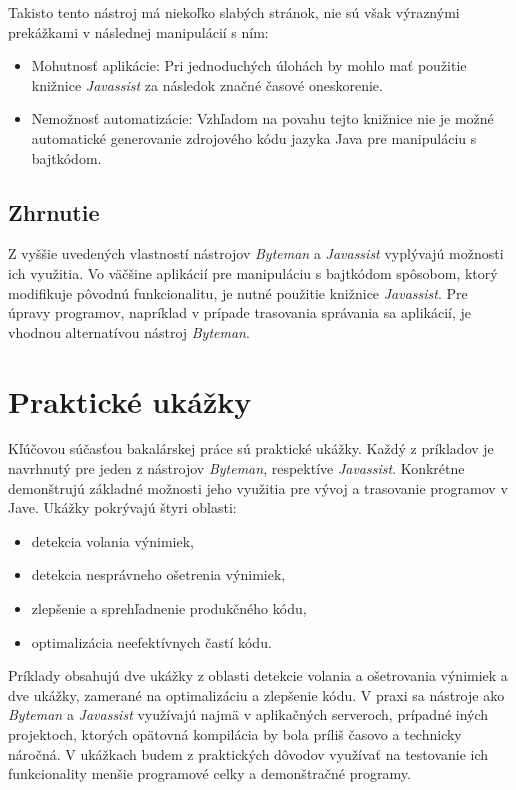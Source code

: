 \documentclass[11pt,final,oneside]{fithesis}
\begin{document}
Takisto tento nástroj má niekoľko slabých stránok, nie sú však výraznými prekážkami v následnej manipulácií s ním:

\begin{itemize}
\item Mohutnosť aplikácie: Pri jednoduchých úlohách by mohlo mať použitie 
knižnice \textit{Javassist} za následok značné časové oneskorenie.
\item Nemožnosť automatizácie: Vzhľadom na povahu tejto knižnice nie je možné 
automatické generovanie zdrojového kódu jazyka Java pre manipuláciu s 
bajtkódom.
\end{itemize}

\section{Zhrnutie}
Z vyššie uvedených vlastností nástrojov \textit{Byteman} a \textit{Javassist} 
vyplývajú možnosti ich využitia. Vo väčšine aplikácií pre manipuláciu s 
bajtkódom spôsobom, ktorý modifikuje pôvodnú funkcionalitu, je nutné použitie 
knižnice \textit{Javassist}. Pre úpravy programov, napríklad v prípade 
trasovania správania sa aplikácií, je vhodnou alternatívou nástroj 
\textit{Byteman}.

\chapter{Praktické ukážky}

Kľúčovou súčasťou bakalárskej práce sú praktické ukážky. Každý z príkladov je 
navrhnutý pre jeden z nástrojov \textit{Byteman}, respektíve 
\textit{Javassist}. Konkrétne demonštrujú základné možnosti jeho využitia pre 
vývoj a trasovanie programov v Jave. Ukážky pokrývajú štyri oblasti:

\begin{itemize}
\item detekcia volania výnimiek, 
\item detekcia nesprávneho ošetrenia výnimiek,
\item zlepšenie a sprehľadnenie produkčného kódu,
\item optimalizácia neefektívnych častí kódu.
\end{itemize}

Príklady obsahujú dve ukážky z oblasti detekcie volania a ošetrovania výnimiek 
a dve ukážky, zamerané na optimalizáciu a zlepšenie kódu. V praxi sa nástroje 
ako \textit{Byteman} a \textit{Javassist} využívajú najmä v aplikačných 
serveroch, prípadné iných projektoch, ktorých opätovná kompilácia by bola 
príliš časovo a technicky náročná. V ukážkach budem z praktických dôvodov 
využívať na testovanie ich funkcionality menšie programové celky a demonštračné
programy.
\end{document}
